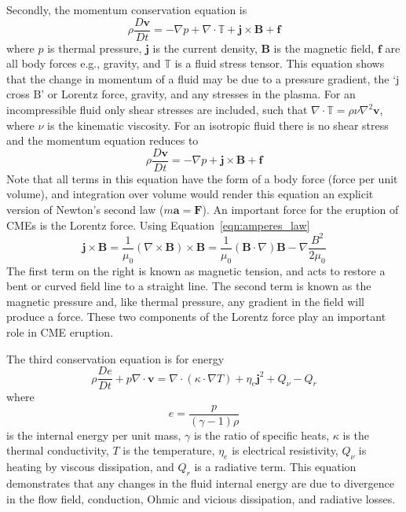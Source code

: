 Secondly, the momentum conservation equation is
\begin{equation}
\rho\frac{D\mathbf{v}}{Dt}=-\nabla p + \nabla \cdot \mathbb{T} + \mathbf{j}\times \mathbf{B} + \mathbf{f}
\label{eqn:mhd_momentum1}
\end{equation}
where $p$ is thermal pressure, $\mathbf{j}$ is the current density, $\mathbf{B}$ is the magnetic field, $\mathbf{f}$ are all body forces e.g., gravity, and $\mathbb{T}$ is a fluid stress tensor. This equation shows that the change in momentum of a fluid may be due to a pressure gradient, the \textquoteleft j cross B' or Lorentz force, gravity, and any stresses in the plasma. For an incompressible fluid only shear stresses are included, such that $\nabla \cdot \mathbb{T}=\rho\nu\nabla^2\mathbf{v}$, where $\nu$ is the kinematic viscosity. For an isotropic fluid there is no shear stress and the momentum equation reduces to 
\begin{equation}
\rho\frac{D\mathbf{v}}{Dt}=-\nabla p + \mathbf{j}\times \mathbf{B} + \mathbf{f}
\label{eqn:mhd_momentum2}
\end{equation}
Note that all terms in this equation have the form of a body force (force per unit volume), and integration over volume would render this equation an explicit version of Newton's second law ($m\mathbf{a}=\mathbf{F}$). An important force for the eruption of CMEs is the Lorentz force. Using Equation~\ref{eqn:amperes_law}
\begin{equation}
\mathbf{j}\times \mathbf{B} = \frac{1}{\mu_0}(\nabla \times \mathbf{B})\times \mathbf{B} = \frac{1}{\mu_0}(\mathbf{B} \cdot \nabla)\mathbf{B} - \nabla \frac{B^2}{2\mu_0}
\end{equation}
The first term on the right is known as magnetic tension, and acts to restore a bent or curved field line to a straight line. The second term is known as the magnetic pressure and, like thermal pressure, any gradient in the field will produce a force. These two components of the Lorentz force play an important role in CME eruption.

The third conservation equation is for energy
\begin{equation}
\rho\frac{De}{Dt} + p\nabla\cdot \mathbf{v}=\nabla\cdot(\kappa\cdot\nabla T) +  \eta_e\mathbf{j}^2 + Q_{\nu} - Q_r
\end{equation}
where 
\begin{equation}
e = \frac{p}{(\gamma-1)\rho}
\end{equation}
is the internal energy per unit mass, $\gamma$ is the ratio of specific heats, $\kappa$ is the thermal conductivity, $T$ is the temperature, $\eta_e$ is electrical resistivity, $Q_{\nu}$ is heating by viscous dissipation, and $Q_r$ is a radiative term. This equation demonstrates that any changes in the fluid internal energy are due to divergence in the flow field, conduction, Ohmic and vicious dissipation, and radiative losses.

